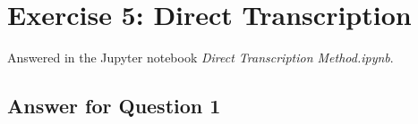 \section*{Exercise 5: Direct Transcription}
Answered in the Jupyter notebook \textit{Direct Transcription Method.ipynb}.

\subsection*{Answer for Question 1}
